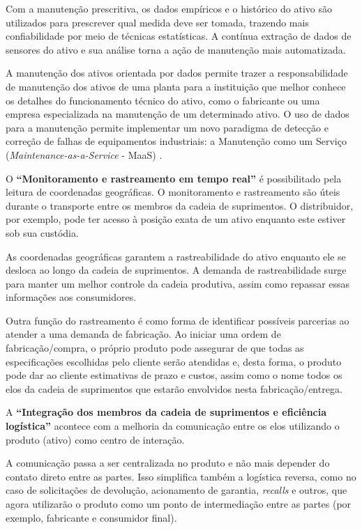 Com a manutenção prescritiva, os dados empíricos e o histórico do ativo são utilizados para prescrever qual medida deve ser tomada, trazendo mais confiabilidade por meio de técnicas estatísticas. A contínua extração de dados de sensores do ativo e sua análise torna a ação de manutenção mais automatizada.

A manutenção dos ativos orientada por dados permite trazer a responsabilidade de manutenção dos ativos de uma planta para a instituição que melhor conhece os detalhes do funcionamento técnico do ativo, como o fabricante ou uma empresa especializada na manutenção de um determinado ativo. O uso de dados para a manutenção permite implementar um novo paradigma de detecção e correção de falhas de equipamentos industriais: a Manutenção como um Serviço (\textit{Maintenance-as-a-Service} - MaaS) \cite{zoll2018maas}.

O \textbf{``Monitoramento e rastreamento em tempo real''} é possibilitado pela leitura de coordenadas geográficas. O monitoramento e rastreamento são úteis durante o transporte entre os membros da cadeia de suprimentos. O distribuidor, por exemplo, pode ter acesso à posição exata de um ativo enquanto este estiver sob sua custódia.

As coordenadas geográficas garantem a rastreabilidade do ativo enquanto ele se desloca ao longo da cadeia de suprimentos. A demanda de rastreabilidade surge para manter um melhor controle da cadeia produtiva, assim como repassar essas informações aos consumidores.

Outra função do rastreamento é como forma de identificar possíveis parcerias ao atender a uma demanda de fabricação. Ao iniciar uma ordem de fabricação/compra, o próprio produto pode assegurar de que todas as especificações escolhidas pelo cliente serão atendidas e, desta forma, o produto pode dar ao cliente estimativas de prazo e custos, assim como o nome todos os elos da cadeia de suprimentos que estarão envolvidos nesta fabricação/entrega.

A \textbf{``Integração dos membros da cadeia de suprimentos e eficiência logística''} acontece com a melhoria da comunicação entre os elos utilizando o produto (ativo) como centro de interação.

A comunicação passa a ser centralizada no produto e não mais depender do contato direto entre as partes. Isso simplifica também a logística reversa, como no caso de solicitações de devolução, acionamento de garantia, \textit{recalls} e outros, que agora utilizarão o produto como um ponto de intermediação entre as partes (por exemplo, fabricante e consumidor final).

